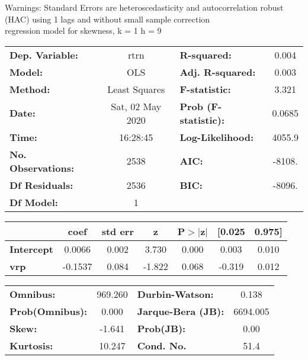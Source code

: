 Warnings: \newline
 [1] Standard Errors are heteroscedasticity and autocorrelation robust (HAC) using 1 lags and without small sample correction\\ 

regression model for skewness, k = 1 h = 9\begin{center}
\begin{tabular}{lclc}
\toprule
\textbf{Dep. Variable:}    &       rtrn       & \textbf{  R-squared:         } &     0.004   \\
\textbf{Model:}            &       OLS        & \textbf{  Adj. R-squared:    } &     0.003   \\
\textbf{Method:}           &  Least Squares   & \textbf{  F-statistic:       } &     3.321   \\
\textbf{Date:}             & Sat, 02 May 2020 & \textbf{  Prob (F-statistic):} &   0.0685    \\
\textbf{Time:}             &     16:28:45     & \textbf{  Log-Likelihood:    } &    4055.9   \\
\textbf{No. Observations:} &        2538      & \textbf{  AIC:               } &    -8108.   \\
\textbf{Df Residuals:}     &        2536      & \textbf{  BIC:               } &    -8096.   \\
\textbf{Df Model:}         &           1      & \textbf{                     } &             \\
\bottomrule
\end{tabular}
\begin{tabular}{lcccccc}
                   & \textbf{coef} & \textbf{std err} & \textbf{z} & \textbf{P$> |$z$|$} & \textbf{[0.025} & \textbf{0.975]}  \\
\midrule
\textbf{Intercept} &       0.0066  &        0.002     &     3.730  &         0.000        &        0.003    &        0.010     \\
\textbf{vrp}       &      -0.1537  &        0.084     &    -1.822  &         0.068        &       -0.319    &        0.012     \\
\bottomrule
\end{tabular}
\begin{tabular}{lclc}
\textbf{Omnibus:}       & 969.260 & \textbf{  Durbin-Watson:     } &    0.138  \\
\textbf{Prob(Omnibus):} &   0.000 & \textbf{  Jarque-Bera (JB):  } & 6694.005  \\
\textbf{Skew:}          &  -1.641 & \textbf{  Prob(JB):          } &     0.00  \\
\textbf{Kurtosis:}      &  10.247 & \textbf{  Cond. No.          } &     51.4  \\
\bottomrule
\end{tabular}
\end{center}

